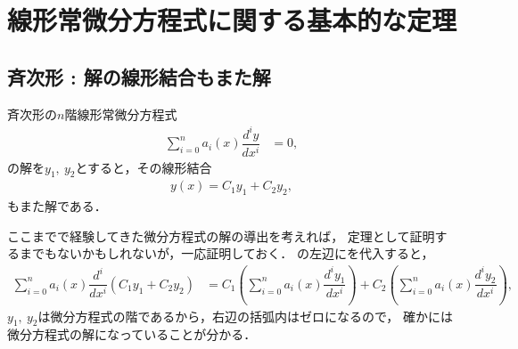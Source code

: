\section{線形常微分方程式に関する基本的な定理}
%
\subsection{斉次形 : 解の線形結合もまた解}
%
\begin{shadebox}
斉次形の$n$階線形常微分方程式
\begin{align}
 \sum_{i=0}^{n}a_{i}\left(x\right)\dfrac{d^{i}y}{dx^{i}}& =0, 
\label{eq:homo_linear}
\end{align}
の解を$y_1,~y_2$とすると，その線形結合
\begin{align}
  y\left(x\right) = C_{1}y_{1} + C_{2}y_{2},  \label{eq:homo_linear_comb_sol}
\end{align}
もまた解である．
\end{shadebox}
%
ここまでで経験してきた微分方程式の解の導出を考えれば，
定理として証明するまでもないかもしれないが，一応証明しておく．
の左辺にを代入すると，
\begin{align}
 \sum_{i=0}^{n}a_{i}\left(x\right)\dfrac{d^{i}}{dx^{i}}\left(C_{1}y_{1}+C_{2}y_{2}\right) & =C_{1}\left(\sum_{i=0}^{n}a_{i}\left(x\right)\dfrac{d^{i}y_{1}}{dx^{i}}\right)+C_{2}\left(\sum_{i=0}^{n}a_{i}\left(x\right)\dfrac{d^{i}y_{2}}{dx^{i}}\right),
\end{align}
$y_1,~y_2$は微分方程式の階であるから，右辺の括弧内はゼロになるので，
確かには微分方程式の解になっていることが分かる．
%
